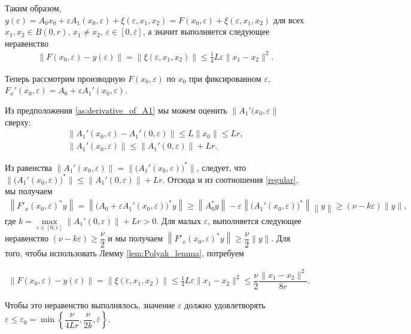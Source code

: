 \documentclass[../main.tex]{subfiles}
\begin{document}
Таким образом, $y(\varepsilon) = A_0x_0 + \varepsilon A_1(x_0,\varepsilon) + \xi(\varepsilon,x_1,x_2) = F(x_0,\varepsilon) + \xi(\varepsilon,x_1,x_2)$ для всех $x_1, x_2 \in B(0,r)$, $x_1 \neq x_2$, $\varepsilon \in [0, \overline{\varepsilon}]$, а значит выполняется следующее неравенство
\begin{gather*}
	\| F(x_0,\varepsilon) - y(\varepsilon) \| = \|\xi(\varepsilon,x_1,x_2)\| \leqslant \frac{1}{4}L\varepsilon\|x_1-x_2\|^2.
\end{gather*}


Теперь рассмотрим производную $F(x_0, \varepsilon)$ по $x_0$ при фиксированном $\varepsilon$, $F_x'(x_0,\varepsilon) = A_0 + \varepsilon A_1'(x_0,\varepsilon) $.

Из предположения \ref{as:derivative_of_A1} мы можем оценить $\|A_1'(x_0,\varepsilon\|$ сверху:
\begin{gather*}
	\|A_1'(x_0,\varepsilon) - A_1'(0,\varepsilon)\| \leqslant 
	L\|x_0\| \leqslant
	L r, \\
	\|A_1'(x_0,\varepsilon)\|  \leqslant \| A_1'(0,\varepsilon)\| + Lr.
\end{gather*}

Из равенства $\|A_1'(x_0,\varepsilon)\| = \|\big(A_1'(x_0,\varepsilon)\big)^*\| $, следует, что  $\|\big(A_1'(x_0,\varepsilon)\big)^*\| \leqslant \| A_1'(0,\varepsilon)\| + Lr$.
Отсюда и из соотношения \eqref{regular}, мы получаем 
\begin{gather*}
	\left\|F'_x(x_0, \varepsilon)^* y\right\| = \left\|\big(A_0 + \varepsilon A_1'(x_0, \varepsilon)\big)^* y\right\| \geqslant \left\|A_0^*y \right\| - \varepsilon \left\|\big(A_1'(x_0,\varepsilon)\big)^*\right\| \left\|y\right\| \geqslant (\nu - k\varepsilon)\|y\|,
\end{gather*} где $k = \max\limits_{\varepsilon \in [0,\overline{\varepsilon}]}\| A_1'(0,\varepsilon)\| + Lr > 0$.
Для малых $\varepsilon$, выполняется следующее неравенство $(\nu - k\varepsilon) \geqslant \dfrac{\nu}{2}$ и мы получаем $\left\|F'_x(x_0, \varepsilon)^* y\right\| \geqslant \dfrac{\nu}{2} \|y\|$. Для того, чтобы использовать Лемму  \ref{lem:Polyak_lemma}, потребуем

\begin{gather*}
	\| F(x_0,\varepsilon) - y(\varepsilon) \| = \|\xi(\varepsilon,x_1,x_2)\| \leqslant \frac{1}{4}L\varepsilon\|x_1-x_2\|^2 \leqslant \dfrac{\nu}{2} \dfrac{\|x_1-x_2\|^2}{8r}.
\end{gather*}

Чтобы это неравенство выполнялось, значение  $\varepsilon$ должно удовлетворять $\varepsilon \leqslant \varepsilon_0 = \min\left\{\dfrac{\nu}{4Lr}, \dfrac{\nu}{2k}, \overline{\varepsilon}\right\}$. 
\end{document}
